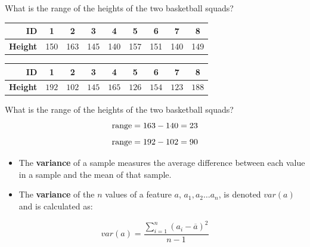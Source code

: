 \documentclass[xcolor={table}]{beamer}
\newcommand{\keyword}[1]{\alert{\textbf{#1}}\index{#1}}
\newcommand{\indexkeyword}[1]{\alert{\textbf{#1}\index{#1}}}
\begin{document}
 \begin{frame} 
	\begin{example}
	What is the range of the heights of the two basketball squads?
 		\begin{table}[!htb]
			\label{table:BasketballTeamHeights}
			\centering
			\begin{footnotesize}
			\begin{tabular}{ r | c c c c c c c c}
			\textbf{ID} & 1 & 2 & 3 & 4  & 5 & 6 & 7 & 8 \\
			\hline
			\textbf{Height} & 150 & 163 & 145 & 140 & 157 & 151 & 140 & 149 \\
			\end{tabular}
			\end{footnotesize}
		\end{table}
		\begin{table}
		\label{table:BasketballTeamHeights2}
		\centering
		\begin{footnotesize}
		\begin{tabular}{ r |  c c c c c c c c }
		\textbf{ID} & 1 & 2 & 3 & 4  & 5 & 6 & 7 & 8 \\
		\hline
		\textbf{Height} & $192$ & $102$ & $145$ & $165$ & $126$ & $154$ & $123$ & $188$ \\
		\end{tabular}
		\end{footnotesize}
		\end{table}
\end{example}
\end{frame} 

 \begin{frame} 
	\begin{example}
	What is the range of the heights of the two basketball squads?
	\begin{equation*}
	\centering
	\text{range}=163 - 140 = 23
	\label{eq:range}
	\end{equation*}
	\begin{equation*}
	\centering
	\text{range}=192 - 102 = 90
	\label{eq:range}
	\end{equation*}
\end{example}
\end{frame} 




\begin{frame} 
\begin{itemize}
\item The \keyword{variance} of a sample measures the average difference between each value in a sample and the mean of that sample. 
\item The \indexkeyword{variance} of the $n$ values of a feature $a$, $a_1, a_2 \ldots a_n$, is denoted $var(a)$ and is calculated as: 
\end{itemize}
\begin{equation*}
var(a)= \displaystyle\frac{\displaystyle\sum_{i=1}^{n} \left( a_i - \overline{a} \right)^2}{n-1}
\label{eq:sample_variance}
\end{equation*}
\end{frame} 
\end{document}
